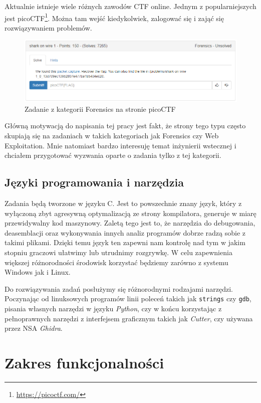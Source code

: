\documentclass[language=polish,type=eng]{aghmodern}
\begin{document}
Aktualnie istnieje wiele różnych zawodów CTF online. Jednym z popularniejszych
jest \mbox{picoCTF}\footnote{\url{https://picoctf.com/}}.
Można tam wejść kiedykolwiek, zalogować się i zająć się rozwiązywaniem problemów.

\begin{figure}[H]
\centering
\includegraphics[width=\textwidth]{picoctf}
\caption{Zadanie z kategorii Forensics na stronie picoCTF}
\end{figure}

Główną motywacją do napisania tej pracy jest fakt, że strony tego typu często skupiają
się na zadaniach w takich kategoriach jak Forensics czy Web Exploitation.
Mnie natomiast bardzo interesuję temat inżynierii wstecznej i chciałem
przygotować wyzwania oparte o zadania tylko z tej kategorii.

\section{Języki programowania i narzędzia}

Zadania będą tworzone w języku C. Jest to powszechnie znany język, który
z wyłączoną zbyt agresywną optymalizacją ze strony kompilatora, generuje
w miarę przewidywalny kod maszynowy. Zaletą tego jest to, że narzędzia
do debugowania, deasemblacji oraz wykonywania innych analiz programów
dobrze radzą sobie z takimi plikami. Dzięki temu język ten
zapewni nam kontrolę nad tym w jakim stopniu graczowi ułatwimy
lub utrudnimy rozgrywkę. W celu zapewnienia większej różnorodności
środowisk korzystać będziemy zarówno z systemu Windows jak i Linux.

Do rozwiązywania zadań posłużymy się różnorodnymi rodzajami narzędzi.
Poczynając od linuksowych programów linii poleceń takich jak \texttt{strings}
czy \texttt{gdb}, pisania własnych narzędzi w języku \emph{Python},
czy w końcu korzystając z pełnoprawnych narzędzi z interfejsem graficznym takich
jak \emph{Cutter}, czy używana przez NSA \emph{Ghidra}.

\chapter{Zakres funkcjonalności}
\end{document}
